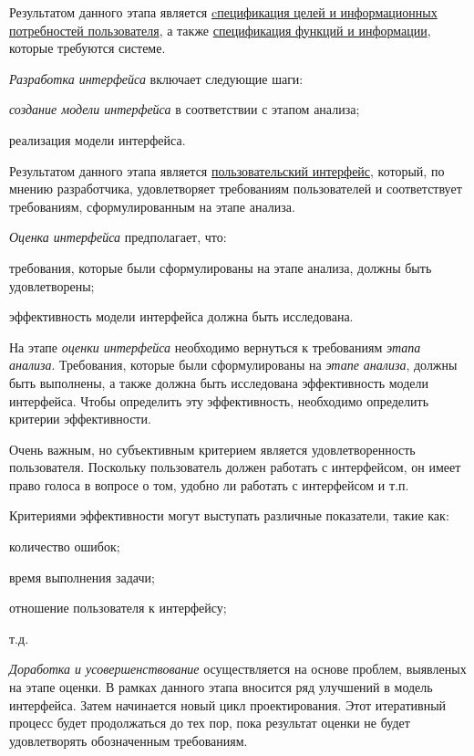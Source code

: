 Результатом данного этапа является \uline{cпецификация целей и информационных потребностей пользователя}, а также
\uline{спецификация функций и информации}, которые требуются системе.

\textit{Разработка интерфейса} включает следующие шаги:
\begin{textitemize}
	\item \textit{создание модели интерфейса} в соответствии с этапом анализа;
	\item реализация модели интерфейса.
\end{textitemize}

Результатом данного этапа является \uline{пользовательский интерфейс}, который, по мнению разработчика, удовлетворяет требованиям пользователей и соответствует требованиям, сформулированным на этапе анализа.

\textit{Оценка интерфейса} предполагает, что:
\begin{textitemize}
	\item требования, которые были сформулированы на этапе анализа, должны быть удовлетворены;
	\item эффективность модели интерфейса должна быть исследована.
\end{textitemize}

На этапе \textit{оценки интерфейса} необходимо вернуться к требованиям \textit{этапа анализа}. Требования, которые
были сформулированы на \textit{этапе анализа}, должны быть выполнены, а также должна быть исследована эффективность модели интерфейса.
Чтобы определить эту эффективность, необходимо определить критерии эффективности.

Очень важным, но субъективным критерием является удовлетворенность пользователя. Поскольку пользователь должен работать с интерфейсом, он имеет право голоса в вопросе о том, удобно ли работать с интерфейсом и т.п.

Критериями эффективности могут выступать различные показатели, такие как:
\begin{textitemize}
	\item количество ошибок;
	\item время выполнения задачи;
	\item отношение пользователя к интерфейсу;
	\item т.д.
\end{textitemize}

\textit{Доработка и усовершенствование} осуществляется на основе проблем, выявленых на этапе оценки. В рамках данного этапа вносится ряд улучшений в модель интерфейса. Затем начинается новый цикл проектирования. Этот итеративный процесс будет продолжаться до тех пор, пока результат оценки не будет удовлетворять обозначенным требованиям. 

